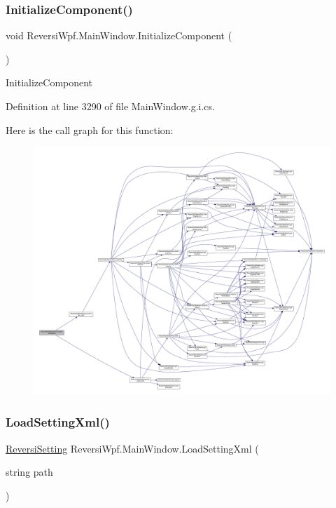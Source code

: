 \subsubsection{\texorpdfstring{Initialize\+Component()}{InitializeComponent()}\hspace{0.1cm}{\footnotesize\ttfamily [4/4]}}
{\footnotesize\ttfamily void Reversi\+Wpf.\+Main\+Window.\+Initialize\+Component (\begin{DoxyParamCaption}{ }\end{DoxyParamCaption})}



Initialize\+Component 



Definition at line 3290 of file Main\+Window.\+g.\+i.\+cs.

Here is the call graph for this function\+:
\nopagebreak
\begin{figure}[H]
\begin{center}
\leavevmode
\includegraphics[width=350pt]{class_reversi_wpf_1_1_main_window_a4cf9bc92cee02fa8e3b00fa56fb41c82_cgraph}
\end{center}
\end{figure}
\mbox{\label{class_reversi_wpf_1_1_main_window_ad911eb50aa81ec46e9f1032f264ee483}} 
\subsubsection{\texorpdfstring{Load\+Setting\+Xml()}{LoadSettingXml()}}
{\footnotesize\ttfamily \hyperlink{class_reversi_wpf_1_1_reversi_setting}{Reversi\+Setting} Reversi\+Wpf.\+Main\+Window.\+Load\+Setting\+Xml (\begin{DoxyParamCaption}\item[{string}]{path }\end{DoxyParamCaption})}



